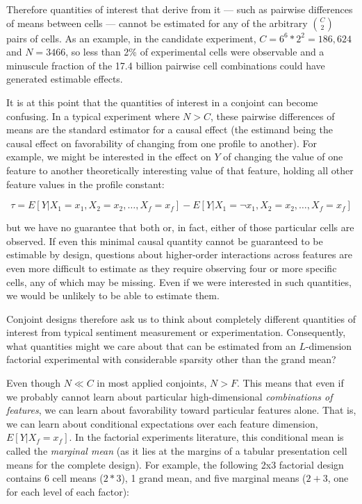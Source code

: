 \documentclass[a4paper,12pt]{article}\usepackage[]{graphicx}\usepackage[]{color}
\begin{document}
Therefore quantities of interest that derive from it --- such as pairwise differences of means between cells --- cannot be estimated for any of the arbitrary $\binom{C}{2}$ pairs of cells. As an example, in the \cite{HainmuellerHopkinsYamamoto2014} candidate experiment, $C = 6^6 * 2^2 = 186,624$ and $N = 3466$, so less than 2\% of experimental cells were observable and a minuscule fraction of the 17.4 billion pairwise cell combinations could have generated estimable effects. 

It is at this point that the quantities of interest in a conjoint can become confusing. In a typical experiment where $N > C$, these pairwise differences of means are the standard estimator for a causal effect (the estimand being the causal effect on favorability of changing from one profile to another). For example, we might be interested in the effect on $Y$ of changing the value of one feature to another theoretically interesting value of that feature, holding all other feature values in the profile constant:

\begin{equation}
\tau = E[Y|X_1=x_1,X_2=x_2,\dots,X_f=x_f] - E[Y|X_1= \neg x_1,X_2=x_2,\dots,X_f=x_f]
\end{equation}

\noindent but we have no guarantee that both or, in fact, either of those particular cells are observed. If even this minimal causal quantity cannot be guaranteed to be estimable by design, questions about higher-order interactions across features are even more difficult to estimate as they require observing four or more specific cells, any of which may be missing. Even if we were interested in such quantities, we would be unlikely to be able to estimate them.

Conjoint designs therefore ask us to think about completely different quantities of interest from typical sentiment measurement or experimentation. Consequently, what quantities might we care about that can be estimated from an $L$-dimension factorial experimental with considerable sparsity other than the grand mean? 

Even though $N \ll C$ in most applied conjoints, $N > F$. This means that even if we probably cannot learn about particular high-dimensional \textit{combinations of features}, we can learn about favorability toward particular features alone. That is, we can learn about conditional expectations over each feature dimension, $E[Y|X_f=x_f]$. In the factorial experiments literature, this conditional mean is called the \textit{marginal mean} (as it lies at the margins of a tabular presentation cell means for the complete design). For example, the following 2x3 factorial design contains 6 cell means ($2*3$), 1 grand mean, and five marginal means ($2+3$, one for each level of each factor):
\end{document}
